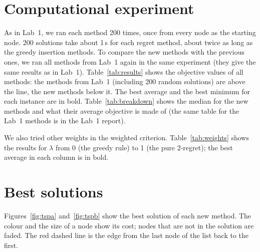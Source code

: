 \documentclass[11pt,a4paper]{article}
\begin{document}
\section{Computational experiment}

As in Lab~1, we ran each method 200 times, once from every node as the
starting node. 200 solutions take about 1\,s for each regret method, about
twice as long as the greedy insertion methods. To compare the new methods
with the previous ones, we ran all methods from Lab~1 again in the same
experiment (they give the same results as in Lab~1). Table~\ref{tab:results}
shows the objective values of all methods: the methods from Lab~1 (including
200 random solutions) are above the line, the new methods below it. The best
average and the best minimum for each instance are in bold.
Table~\ref{tab:breakdown} shows the median for the new methods and what
their average objective is made of (the same table for the Lab~1 methods is
in the Lab~1 report).

\begin{table}[H]
\centering
\small
\caption{Objective function values over 200 solutions per method. Above the line: methods from Lab~1; below: regret heuristics (this lab).}
\label{tab:results}

\end{table}

\begin{table}[H]
\centering
\small
\caption{Regret heuristics: median objective, and average cycle length, node costs and closing edge (part of the length).}
\label{tab:breakdown}

\end{table}

We also tried other weights in the weighted criterion. Table~\ref{tab:weights}
shows the results for $\lambda$ from 0 (the greedy rule) to 1 (the pure
2-regret); the best average in each column is in bold.

\begin{table}[H]
\centering
\small
\caption{Weighted criterion $s_\lambda(j) = \lambda\, r(j) - (1-\lambda)\,\Delta_1(j)$ for different weights $\lambda$, 200 solutions each.}
\label{tab:weights}

\end{table}

\clearpage
\section{Best solutions}

Figures~\ref{fig:tspa} and~\ref{fig:tspb} show the best solution of each new
method. The colour and the size of a node show its cost; nodes that are not in
the solution are faded. The red dashed line is the edge from the last node of
the list back to the first.
\end{document}
